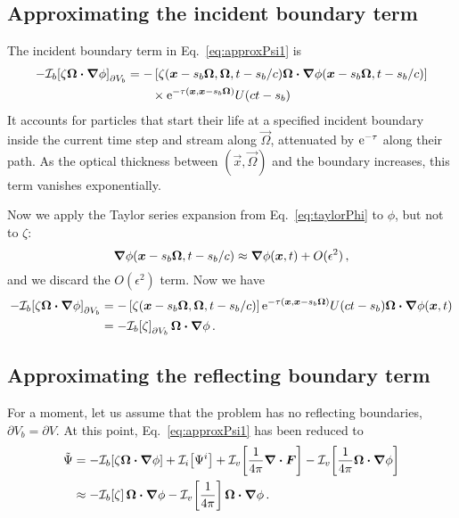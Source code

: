 \subsection{Approximating the incident boundary term}
The incident boundary term in Eq.~\eqref{eq:approxPsi1} is
\begin{align*}
-\mathcal{I}_{b}\!\left[\zeta \bm{\Omega}\bm{\cdot} \bm{\nabla} \phi\right]_{\partial V_b}
  &= -\left[\zeta(\bm{x} - s_b\bm{\Omega}, \bm{\Omega}, t - s_b/c)
   \bm{\Omega}\bm{\cdot} \bm{\nabla} \phi(\bm{x} - s_b\bm{\Omega}, t - s_b/c) \right]
  \\
   &\qquad\times
    \mathop{}\!\mathrm{e}^{ -\tau(\bm{x}, \bm{x} - s_b \bm{\Omega})}
    U(ct - s_b)
\end{align*}
It accounts for particles that start their life at a specified incident boundary
inside the current time step and stream along $\vec{\Omega}$, attenuated by
$\mathop{}\!\mathrm{e}^{-\tau}$ along their path. As the optical thickness between
$(\vec{x}, \vec{\Omega})$ and the boundary increases, this term vanishes
exponentially.

Now we apply the Taylor series expansion from Eq.~\eqref{eq:taylorPhi} to
$\phi$, but not to $\zeta$:
\begin{equation*}
  \bm{\nabla} \phi(\bm{x} - s_b\bm{\Omega}, t - s_b/c)
  \approx \bm{\nabla} \phi(\bm{x}, t) + O(\epsilon^2)\,,
\end{equation*}
and we discard the $O(\epsilon^2)$ term. Now we have
\begin{align} \nonumber
-\mathcal{I}_{b}\!\left[\zeta \bm{\Omega}\bm{\cdot} \bm{\nabla} \phi\right]_{\partial V_b}
&= -\left[\zeta(\bm{x} - s_b\bm{\Omega}, \bm{\Omega}, t - s_b/c) \right]
  \mathop{}\!\mathrm{e}^{ -\tau(\bm{x}, \bm{x} - s_b \bm{\Omega})} U(ct - s_b)
  \bm{\Omega}\bm{\cdot} \bm{\nabla} \phi(\bm{x}, t) 
 \\ \label{eq:bndyApprox}
&= -\mathcal{I}_{b}\!\left[\zeta\right]_{\partial V_b} \bm{\Omega}\bm{\cdot} \bm{\nabla} \phi \,.
\end{align}

\subsection{Approximating the reflecting boundary term}\label{sec:derReflBc}
For a moment, let us assume that the problem has no reflecting boundaries,
$\partial V_b = \partial V$. At this point, Eq.~\eqref{eq:approxPsi1} has been
reduced to
\begin{align*}
  \tilde\Psi
  &= -\mathcal{I}_{b}\!\left[\zeta \bm{\Omega}\bm{\cdot} \bm{\nabla} \phi\right]
    + \mathcal{I}_{i}\!\left[\Psi^i\right]
    + \mathcal{I}_{v}\!\left[\frac{1}{4\pi} \bm{\nabla} \bm{\cdot}\bm{F} \right]
    - \mathcal{I}_{v}\!\left[\frac{1}{4\pi} \bm{\Omega}\bm{\cdot} \bm{\nabla} \phi\right]
\\
  &\approx
  -\mathcal{I}_{b}\!\left[\zeta\right] \bm{\Omega}\bm{\cdot} \bm{\nabla} \phi
  - \mathcal{I}_{v}\!\left[\frac{1}{4\pi}\right] \bm{\Omega}\bm{\cdot} \bm{\nabla} \phi \,.
\end{align*}

